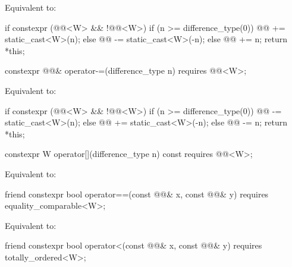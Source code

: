 \begin{itemdescr}
\pnum
\effects
Equivalent to:
\begin{codeblock}
if constexpr (@@<W> && !@@<W>) {
  if (n >= difference_type(0))
    @@ += static_cast<W>(n);
  else
    @@ -= static_cast<W>(-n);
} else {
  @@ += n;
}
return *this;
\end{codeblock}
\end{itemdescr}

\begin{itemdecl}
constexpr @@& operator-=(difference_type n)
  requires @@<W>;
\end{itemdecl}

\begin{itemdescr}
\pnum
\effects
Equivalent to:
\begin{codeblock}
if constexpr (@@<W> && !@@<W>) {
  if (n >= difference_type(0))
    @@ -= static_cast<W>(n);
  else
    @@ += static_cast<W>(-n);
} else {
  @@ -= n;
}
return *this;
\end{codeblock}
\end{itemdescr}

\begin{itemdecl}
constexpr W operator[](difference_type n) const
  requires @@<W>;
\end{itemdecl}

\begin{itemdescr}
\pnum
\effects
Equivalent to: 
\end{itemdescr}

\begin{itemdecl}
friend constexpr bool operator==(const @@& x, const @@& y)
  requires equality_comparable<W>;
\end{itemdecl}

\begin{itemdescr}
\pnum
\effects
Equivalent to: 
\end{itemdescr}

\begin{itemdecl}
friend constexpr bool operator<(const @@& x, const @@& y)
  requires totally_ordered<W>;
\end{itemdecl}

